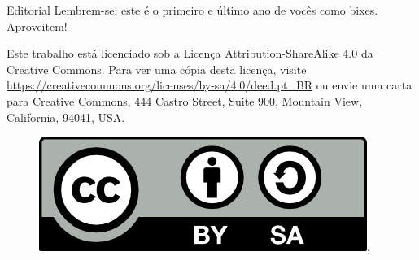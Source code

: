\begin{editorial}{Editorial}
Lembrem-se: este é o primeiro e último ano de vocês como bixes. Aproveitem!


Este trabalho está licenciado sob a Licença Attribution-ShareAlike 4.0 da
Creative Commons. Para ver uma cópia desta licença, visite
\url{https://creativecommons.org/licenses/by-sa/4.0/deed.pt_BR} ou envie
uma carta para Creative Commons, 444 Castro Street, Suite 900, Mountain View,
California, 94041, USA.
\\
\begin{figure}[H]
    \centering
    \includegraphics{img/cc/by-sa.png},
\end{figure}

\end{editorial}
